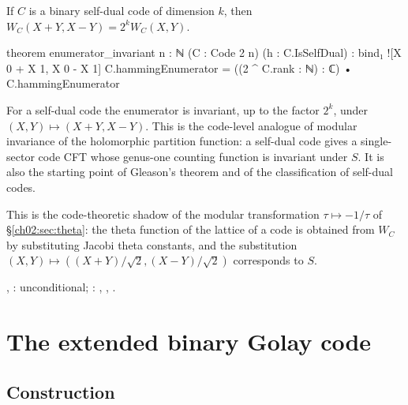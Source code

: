 \begin{corollary}\label{ch02:cor:gleason}
If $C$ is a binary self-dual code of dimension $k$, then
$W_C(X+Y,X-Y)=2^kW_C(X,Y)$.
\end{corollary}
\begin{leancode}
theorem enumerator_invariant {n : ℕ} (C : Code 2 n) (h : C.IsSelfDual) :
    bind₁ ![X 0 + X 1, X 0 - X 1] C.hammingEnumerator
      = ((2 ^ C.rank : ℕ) : ℂ) • C.hammingEnumerator
\end{leancode}
\begin{physics}
For a self-dual code the enumerator is invariant, up to the factor $2^k$, under $(X,Y)\mapsto(X+Y,X-Y)$. This is the code-level analogue of modular invariance of the holomorphic partition function: a self-dual code gives a single-sector code CFT whose genus-one counting function is invariant under $S$. It is also the starting point of Gleason's theorem and of the classification of self-dual codes.
\end{physics}
This is the code-theoretic shadow of the modular transformation $\tau\mapsto-1/\tau$ of
\S\ref{ch02:sec:theta}: the theta function of the lattice of a code is obtained from $W_C$ by
substituting Jacobi theta constants, and the substitution $(X,Y)\mapsto((X+Y)/\sqrt2,(X-Y)/\sqrt2)$
corresponds to $S$.
\begin{status}
, : unconditional; :
, , .
\end{status}

\section{The extended binary Golay code}\label{ch02:sec:golay}

\subsection{Construction}

